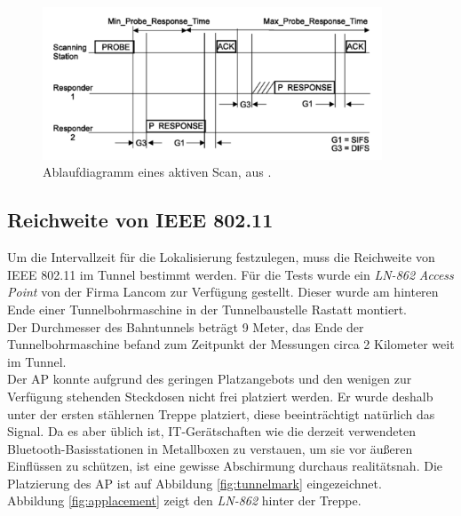 \begin{figure}[h]
  \centering
	\includegraphics[width=0.9\textwidth]{images/activescan.png}
  \caption{Ablaufdiagramm eines aktiven Scan, aus \cite{ieee2012active}.}
  \label{fig:activescan}
\end{figure}


\subsection{Reichweite von IEEE 802.11}
\label{ch:phase1:sec:rangewlan}
Um die Intervallzeit für die Lokalisierung festzulegen, muss die Reichweite von IEEE 802.11 im Tunnel bestimmt werden.
Für die Tests wurde ein \emph{LN-862} \emph{Access Point} von der Firma Lancom zur Verfügung gestellt.
Dieser wurde am hinteren Ende einer Tunnelbohrmaschine in der Tunnelbaustelle Rastatt montiert.\\
Der Durchmesser des Bahntunnels beträgt 9 Meter, das Ende der Tunnelbohrmaschine befand zum Zeitpunkt der Messungen circa 2 Kilometer weit im Tunnel.\\
Der AP konnte aufgrund des geringen Platzangebots und den wenigen zur Verfügung stehenden Steckdosen nicht frei platziert werden.
Er wurde deshalb unter der ersten stählernen Treppe platziert, diese beeinträchtigt natürlich das Signal.
Da es aber üblich ist, IT-Gerätschaften wie die derzeit verwendeten Bluetooth-Basisstationen in Metallboxen zu verstauen, um sie vor äußeren Einflüssen zu schützen, ist eine gewisse Abschirmung durchaus realitätsnah.
Die Platzierung des AP ist auf Abbildung \ref{fig:tunnelmark} eingezeichnet.\\
Abbildung \ref{fig:applacement} zeigt den \emph{LN-862} hinter der Treppe.

